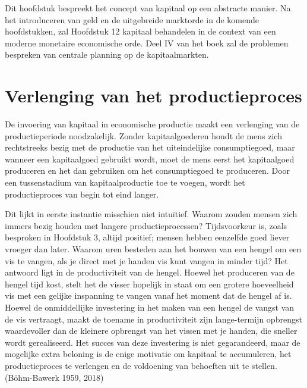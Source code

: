 \documentclass[
  a5paper,
  smalldemyvopaper,11pt,twoside,onecolumn,openright,extrafontsizes,
hidelinks]{memoir}
\begin{document}
Dit hoofdstuk bespreekt het concept van kapitaal op een abstracte
manier. Na het introduceren van geld en de uitgebreide marktorde in de
komende hoofdstukken, zal Hoofdstuk 12 kapitaal behandelen in de context
van een moderne monetaire economische orde. Deel IV van het boek zal de
problemen bespreken van centrale planning op de kapitaalmarkten.

\section{Verlenging van het
productieproces}\label{verlenging-van-het-productieproces}

De invoering van kapitaal in economische productie maakt een verlenging
van de productieperiode noodzakelijk. Zonder kapitaalgoederen houdt de
mens zich rechtstreeks bezig met de productie van het uiteindelijke
consumptiegoed, maar wanneer een kapitaalgoed gebruikt wordt, moet de
mens eerst het kapitaalgoed produceren en het dan gebruiken om het
consumptiegoed te produceren. Door een tussenstadium van
kapitaalproductie toe te voegen, wordt het productieproces van begin tot
eind langer.

Dit lijkt in eerste instantie misschien niet intuïtief. Waarom zouden
mensen zich immers bezig houden met langere productieprocessen?
Tijdsvoorkeur is, zoals besproken in Hoofdstuk 3, altijd positief;
mensen hebben eenzelfde goed liever vroeger dan later. Waarom uren
besteden aan het bouwen van een hengel om een vis te vangen, als je
direct met je handen vis kunt vangen in minder tijd? Het antwoord ligt
in de productiviteit van de hengel. Hoewel het produceren van de hengel
tijd kost, stelt het de visser hopelijk in staat om een grotere
hoeveelheid vis met een gelijke inspanning te vangen vanaf het moment
dat de hengel af is. Hoewel de onmiddellijke investering in het maken
van een hengel de vangst van de vis vertraagt, maakt de toename in
productiviteit zijn lange-termijn opbrengst waardevoller dan de kleinere
opbrengst van het vissen met je handen, die sneller wordt gerealiseerd.
Het succes van deze investering is niet gegarandeerd, maar de mogelijke
extra beloning is de enige motivatie om kapitaal te accumuleren, het
productieproces te verlengen en de voldoening van behoeften uit te
stellen. (Böhm-Bawerk 1959, 2018)
\end{document}
